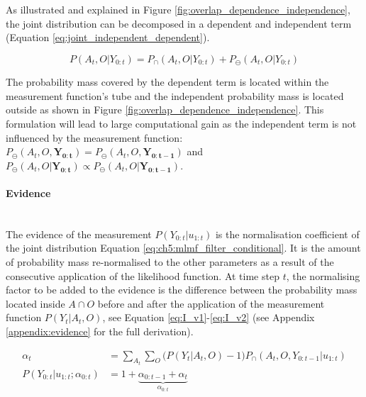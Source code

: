 As illustrated and explained in Figure \ref{fig:overlap_dependence_independence}, the joint distribution can be decomposed in a 
dependent and independent term (Equation \ref{eq:joint_independent_dependent}). 

\begin{equation}\label{eq:joint_independent_dependent}
 P(A_t,O|Y_{0:t}) = P_{\cap}(A_t,O|Y_{0:t}) + P_{\ominus}(A_t,O|Y_{0:t})
\end{equation}

The probability mass covered by the dependent term is located within the measurement function's tube and the independent probability mass 
is located outside as shown in Figure \ref{fig:overlap_dependence_independence}. This formulation will lead to large computational gain 
as the independent term is not influenced by the measurement function: 
$P_{\ominus}(A_t,O,\mathbf{Y_{0:t}}) = P_{\ominus}(A_t,O,\mathbf{Y_{0:t-1}})$ and 
$P_{\ominus}(A_t,O|\mathbf{Y_{0:t}}) \propto P_{\ominus}(A_t,O|\mathbf{Y_{0:t-1}})$.

\paragraph{Evidence}\\
The evidence of the measurement $P(Y_{0:t}|u_{1:t})$ is the normalisation coefficient of the joint distribution Equation \ref{eq:ch5:mlmf_filter_conditional}.
It is the amount of probability mass re-normalised to the other parameters as a result of the consecutive application of the likelihood function.
At time step $t$, the normalising factor to be added to the evidence is the difference between the probability mass located 
inside $A\cap O$ before and after the application of the measurement function $P(Y_t|A_t,O)$, 
see Equation \ref{eq:I_v1}-\ref{eq:I_v2} (see Appendix \ref{appendix:evidence} for the full derivation).

\begin{align}
 \alpha_t 			 	&= \sum\limits_{A_t}\sum\limits_{O} \Big(P(Y_t|A_t,O) - 1\Big)P_{\cap}(A_t,O,Y_{0:t-1}|u_{1:t}) \label{eq:I_v1} \\
 P(Y_{0:t}|u_{1:t};\alpha_{0:t})        &= 1 + \underbrace{\alpha_{0:t-1} + \alpha_t}_{\alpha_{0:t}} \label{eq:I_v2}
\end{align}

